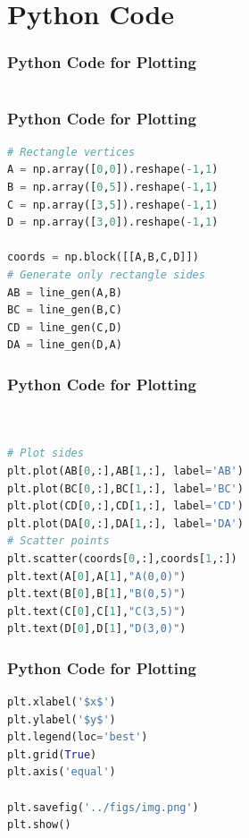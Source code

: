 \documentclass{beamer}
\theoremstyle{remark}
\numberwithin{equation}{section}
\begin{document}
\section{Python Code}
\begin{frame}[fragile]
\frametitle{Python Code for Plotting}
\begin{lstlisting}[language=Python]

\end{lstlisting}

\end{frame}
\begin{frame}[fragile]
\frametitle{Python Code for Plotting}
\begin{lstlisting}[language=Python]
# Rectangle vertices
A = np.array([0,0]).reshape(-1,1)
B = np.array([0,5]).reshape(-1,1)
C = np.array([3,5]).reshape(-1,1)
D = np.array([3,0]).reshape(-1,1)

coords = np.block([[A,B,C,D]])
# Generate only rectangle sides
AB = line_gen(A,B)
BC = line_gen(B,C)
CD = line_gen(C,D)
DA = line_gen(D,A)
\end{lstlisting}

\end{frame}
\begin{frame}[fragile]
\frametitle{Python Code for Plotting}
\begin{lstlisting}[language=Python]


# Plot sides
plt.plot(AB[0,:],AB[1,:], label='AB')
plt.plot(BC[0,:],BC[1,:], label='BC')
plt.plot(CD[0,:],CD[1,:], label='CD')
plt.plot(DA[0,:],DA[1,:], label='DA')
# Scatter points
plt.scatter(coords[0,:],coords[1,:])
plt.text(A[0],A[1],"A(0,0)") 
plt.text(B[0],B[1],"B(0,5)")
plt.text(C[0],C[1],"C(3,5)")
plt.text(D[0],D[1],"D(3,0)")

\end{lstlisting}

\end{frame}
\begin{frame}[fragile]
\frametitle{Python Code for Plotting}
\begin{lstlisting}[language=Python]
plt.xlabel('$x$')
plt.ylabel('$y$')
plt.legend(loc='best')
plt.grid(True)
plt.axis('equal')

plt.savefig('../figs/img.png')
plt.show()
\end{lstlisting}

\end{frame}
\end{document}
